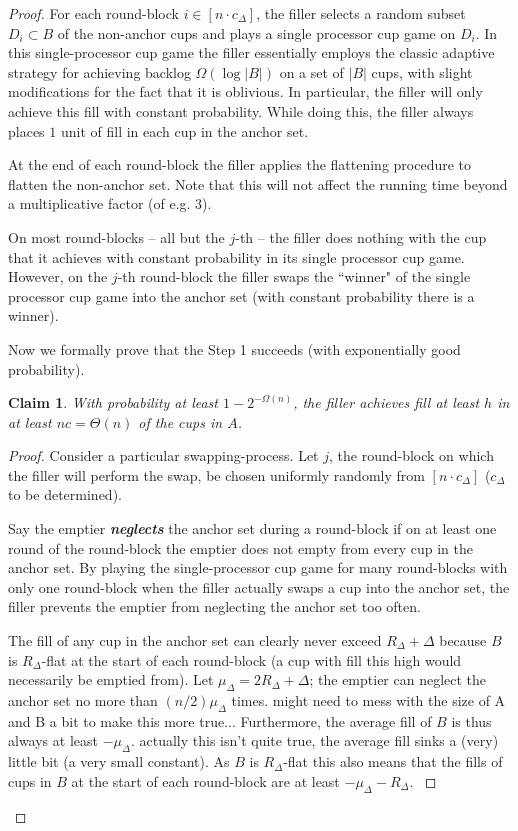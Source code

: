 \documentclass[twocolumn]{article}[10pt]
\newcommand{\defn}[1]{{\textit{\textbf{\boldmath #1}}}\xspace}
\newtheorem{clm}{Claim}
\begin{document}
\begin{proof}
For each round-block $i\in [n\cdot c_\Delta]$, the filler selects a random subset
$D_i\subset B$ of the non-anchor cups and plays a single processor cup game on
$D_i$. In this single-processor cup game the filler essentially employs the
classic adaptive strategy for achieving backlog $\Omega(\log |B|)$ on a set of
$|B|$ cups, with slight modifications for the fact that it is oblivious. In
particular, the filler will only achieve this fill with constant probability.
While doing this, the filler always places $1$ unit of fill in each cup in the
anchor set. 

At the end of each round-block the filler applies the flattening procedure to
flatten the non-anchor set. Note that this will not affect the running time beyond a
multiplicative factor (of e.g. $3$). 

On most round-blocks -- all but the $j$-th -- the filler does nothing with the
cup that it achieves with constant probability in its single processor cup
game. However, on the $j$-th round-block the filler swaps the ``winner" of the
single processor cup game into the anchor set (with constant probability there
is a winner).

Now we formally prove that the Step 1 succeeds (with exponentially good probability).

\begin{clm} \label{clm:reg} 
  With probability at least $1-2^{-\Omega(n)}$, the filler achieves fill
  at least $h$ in at least $nc = \Theta(n)$ of the cups in $A$. 
\end{clm}
\begin{proof}
  Consider a particular swapping-process. Let $j$, the round-block on which the
  filler will perform the swap, be chosen uniformly randomly from $[n\cdot
  c_\Delta]$ ($c_\Delta$ to be determined).
 
  Say the emptier \defn{neglects} the anchor set during a round-block if on at
  least one round of the round-block the emptier does not empty from every cup
  in the anchor set. By playing the single-processor cup game for many
  round-blocks with only one round-block when the filler actually swaps a cup
  into the anchor set, the filler prevents the emptier from neglecting the
  anchor set too often.

  {\color{red} 
  The fill of any cup in the anchor set can clearly never exceed
  $R_\Delta+\Delta$ because $B$ is $R_\Delta$-flat at the start of each
  round-block (a cup with fill this high would necessarily be emptied from).
  Let $\mu_\Delta = 2R_\Delta+\Delta$; the emptier can neglect the anchor set
  no more than $(n/2)\mu_\Delta$ times. 
  {\color{red} might need to mess with the size of A and B a bit to make this more true... }
  Furthermore, the average fill of $B$ is thus always at least $-\mu_\Delta$.
  {\color{red} actually this isn't quite true, the average fill sinks a (very)
  little bit (a very small constant)}.
  As $B$ is $R_\Delta$-flat this also means that the fills of cups in $B$ at
  the start of each round-block are at least $-\mu_\Delta-R_\Delta$.
}


\end{proof}
\end{proof}
\end{document}
